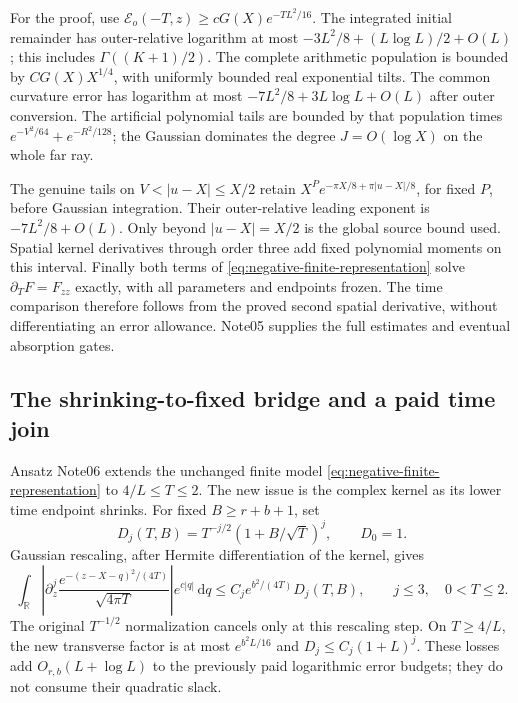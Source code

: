 \documentclass[11pt]{article}
\newcommand{\R}{\mathbb R}
\newcommand{\dd}{\,\mathrm d}
\numberwithin{equation}{section}
\begin{document}
For the proof, use \(\mathcal E_o(-T,z)\ge cG(X)e^{-TL^2/16}\).
The integrated initial remainder has outer-relative logarithm at most
\(-3L^2/8+(L\log L)/2+O(L)\); this includes
\(\Gamma((K+1)/2)\). The complete arithmetic population is bounded
by \(CG(X)X^{1/4}\), with uniformly bounded real exponential tilts.
The common curvature error has logarithm at most
\(-7L^2/8+3L\log L+O(L)\) after outer conversion.
The artificial polynomial tails are bounded by that population times
\(e^{-V^2/64}+e^{-R^2/128}\); the Gaussian dominates the degree
\(J=O(\log X)\) on the whole far ray.

The genuine tails on \(V<|u-X|\le X/2\) retain
\(X^P e^{-\pi X/8+\pi|u-X|/8}\), for fixed \(P\), before Gaussian
integration. Their outer-relative leading exponent is \(-7L^2/8+O(L)\).
Only beyond \(|u-X|=X/2\) is the global source bound used.
Spatial kernel derivatives through order three add fixed polynomial
moments on this interval. Finally both terms of
\eqref{eq:negative-finite-representation} solve \(\partial_TF=F_{zz}\)
exactly, with all parameters and endpoints frozen. The time comparison
therefore follows from the proved second spatial derivative, without
differentiating an error allowance. Note05 supplies the full estimates
and eventual absorption gates.

\subsection{The shrinking-to-fixed bridge and a paid time join}
Ansatz Note06 \cite{ansatz06} extends the unchanged finite model
\eqref{eq:negative-finite-representation} to \(4/L\le T\le2\).
The new issue is the complex kernel as its lower time endpoint shrinks.
For fixed \(B\ge r+b+1\), set
\[
 D_j(T,B)=T^{-j/2}(1+B/\sqrt T)^j,\qquad D_0=1.
\]
Gaussian rescaling, after Hermite differentiation of the kernel, gives
\begin{equation}
 \int_{\R}\left|\partial_z^j
       \frac{e^{-(z-X-q)^2/(4T)}}{\sqrt{4\pi T}}\right|
       e^{c|q|}\dd q
 \le C_j e^{b^2/(4T)}D_j(T,B),\qquad j\le3,\quad0<T\le2.
 \label{eq:bridge-kernel}
\end{equation}
The original \(T^{-1/2}\) normalization cancels only at this rescaling
step. On \(T\ge4/L\), the new transverse factor is at most
\(e^{b^2L/16}\) and \(D_j\le C_j(1+L)^j\).
These losses add \(O_{r,b}(L+\log L)\) to the previously paid
logarithmic error budgets; they do not consume their quadratic slack.
\end{document}
